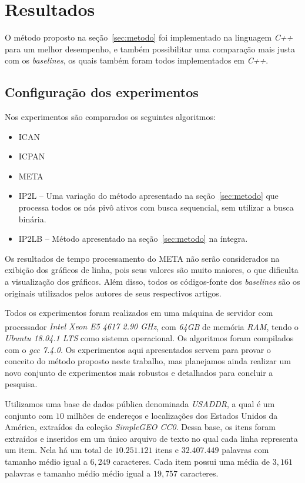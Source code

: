 \section{Resultados}
\label{sec:results}

O método proposto na seção~\ref{sec:metodo} foi implementado na linguagem \textit{C++} para um melhor desempenho, e também possibilitar uma comparação mais justa com os \textit{baselines}, os quais também foram todos implementados em \textit{C++}. 

\subsection{Configuração dos experimentos}
\label{sec:experiments-setup}
Nos experimentos são comparados os seguintes algoritmos:
\begin{itemize}
    \item ICAN \citep{ji2009efficient}
    \item ICPAN \citep{li2011efficient}
    \item META \citep{deng2016meta}
    \item IP2L -- Uma variação do método apresentado na seção~\ref{sec:metodo} que processa todos os nós pivô ativos com busca sequencial, sem utilizar a busca binária.
    \item IP2LB -- Método apresentado na seção~\ref{sec:metodo} na íntegra.
\end{itemize}

Os resultados de tempo processamento do META não serão considerados na exibição dos gráficos de linha, pois seus valores são muito maiores, o que dificulta a visualização dos gráficos. Além disso, todos os códigos-fonte dos \textit{baselines} são os originais utilizados pelos autores de seus respectivos artigos.

Todos os experimentos foram realizados em uma máquina de servidor com processador \textit{Intel \textsuperscript{\textregistered} Xeon E5 4617 2.90 GHz}, com \textit{64GB} de memória \textit{RAM}, tendo o \textit{Ubuntu 18.04.1 LTS} como sistema operacional. Os algoritmos foram compilados com o \textit{gcc 7.4.0}. Os experimentos aqui apresentados servem para provar o conceito do método proposto neste trabalho, mas planejamos ainda realizar um novo conjunto de experimentos mais robustos e detalhados para concluir a pesquisa.

Utilizamos uma base de dados pública denominada \textit{USADDR}, a qual é um conjunto com $10$ milhões de endereços e localizações dos Estados Unidos da América, extraídos da coleção \textit{SimpleGEO CC0}. Dessa base, os itens foram extraídos e inseridos em um único arquivo de texto no qual cada linha representa um item. Nela há um total de $10.251.121$ itens e $32.407.449$ palavras com tamanho médio igual a $6,249$ caracteres. Cada item possui uma média de $3,161$ palavras e tamanho médio médio igual a $19,757$ caracteres.

